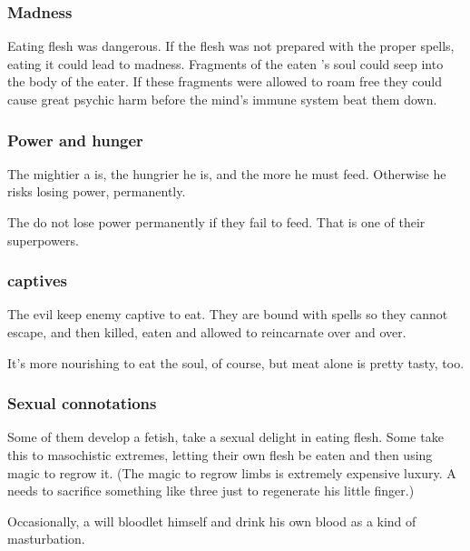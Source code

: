 \subsubsection{Madness}
Eating \resphan flesh was dangerous. 
If the flesh was not prepared with the proper spells, eating it could lead to madness. 
Fragments of the eaten \resphan's soul could seep into the body of the eater. 
If these fragments were allowed to roam free they could cause great psychic harm before the mind's immune system beat them down.





\subsubsection{Power and hunger}
The mightier a \resphan{} is, the hungrier he is, and the more he must feed. Otherwise he risks losing power, permanently. 

The \Malachim{} do not lose power permanently if they fail to feed. That is one of their superpowers. 




\subsubsection{\Resphan{} captives}
The evil \resphain{} keep enemy \resphain{} captive to eat. 
They are bound with spells so they cannot escape, and then killed, eaten and allowed to reincarnate over and over. 

It's more nourishing to eat the soul, of course, but \resphan{} meat alone is pretty tasty, too. 





\subsubsection{Sexual connotations}
Some of them develop a  fetish, take a sexual delight in eating flesh. Some take this to masochistic extremes, letting their own flesh be eaten and then using magic to regrow it. (The magic to regrow limbs is extremely expensive luxury. A \resphan{} needs to sacrifice something like three \humans{} just to regenerate his little finger.) 

Occasionally, a \resphan{} will bloodlet himself and drink his own blood as a kind of masturbation.

















